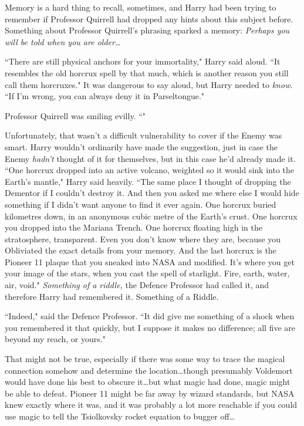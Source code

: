 Memory is a hard thing to recall, sometimes, and Harry had been trying to remember if Professor Quirrell had dropped any hints about this subject before. Something about Professor Quirrell's phrasing sparked a memory: \emph{Perhaps you will be told when you are older…}

``There are still physical anchors for your immortality," Harry said aloud. ``It resembles the old horcrux spell by that much, which is another reason you still call them horcruxes." It was dangerous to say aloud, but Harry needed to \emph{know}. ``If I'm wrong, you can always deny it in Parseltongue."

Professor Quirrell was smiling evilly. ``"

Unfortunately, that wasn't a difficult vulnerability to cover if the Enemy was smart. Harry wouldn't ordinarily have made the suggestion, just in case the Enemy \emph{hadn't} thought of it for themselves, but in this case he'd already made it. ``One horcrux dropped into an active volcano, weighted so it would sink into the Earth's mantle," Harry said heavily. ``The same place I thought of dropping the Dementor if I couldn't destroy it. And then you asked me where else I would hide something if I didn't want anyone to find it ever again. One horcrux buried kilometres down, in an anonymous cubic metre of the Earth's crust. One horcrux you dropped into the Mariana Trench. One horcrux floating high in the stratosphere, transparent. Even you don't know where they are, because you Obliviated the exact details from your memory. And the last horcrux is the Pioneer 11 plaque that you sneaked into NASA and modified. It's where you get your image of the stars, when you cast the spell of starlight. Fire, earth, water, air, void." \emph{Something of a riddle,} the Defence Professor had called it, and therefore Harry had remembered it. Something of a Riddle.

``Indeed," said the Defence Professor. ``It did give me something of a shock when you remembered it that quickly, but I suppose it makes no difference; all five are beyond my reach, or yours."

That might not be true, especially if there was some way to trace the magical connection somehow and determine the location…though presumably Voldemort would have done his best to obscure it…but what magic had done, magic might be able to defeat. Pioneer 11 might be far away by wizard standards, but NASA knew exactly where it was, and it was probably a lot more reachable if you could use magic to tell the Tsiolkovsky rocket equation to bugger off…

